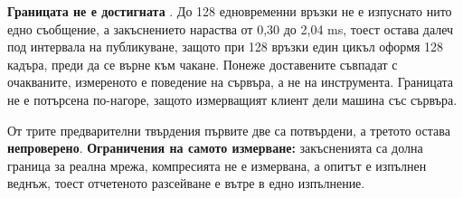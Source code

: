 \textbf{Границата не е достигната} . До 128 едновременни връзки не е
изпуснато нито едно съобщение, а закъснението нараства от 0,30 до 2,04 ms, тоест остава далеч
под интервала на публикуване, защото при 128 връзки един цикъл оформя 128 кадъра, преди да се
върне към чакане. Понеже доставените съвпадат с очакваните, измереното е поведение на сървъра,
а не на инструмента. Границата не е потърсена по-нагоре, защото измерващият клиент дели машина
със сървъра.

От трите предварителни твърдения първите две са потвърдени, а третото остава
\textbf{непроверено}. \textbf{Ограничения на самото измерване:} закъсненията са долна граница
за реална мрежа, компресията не е измервана, а опитът е изпълнен веднъж, тоест отчетеното
разсейване е вътре в едно изпълнение.

